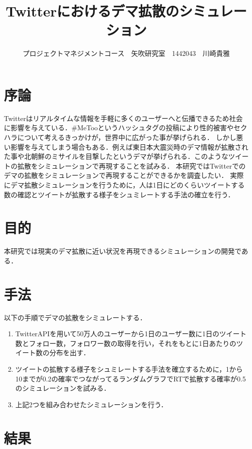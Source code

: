 \documentclass[uplatex,twocolumn,dvipdfmx]{jsarticle}
\title{\vspace{-5mm}\fontsize{14pt}{0pt}\selectfont Twitterにおけるデマ拡散のシミュレーション}
\author{\normalsize プロジェクトマネジメントコース　矢吹研究室　1442043　川崎貴雅}
\date{}
\begin{document}
\fontsize{10.5pt}{\baselineskip}\selectfont
\maketitle



\section{序論}\label{序論}

Twitterはリアルタイムな情報を手軽に多くのユーザーへと伝播できるため社会に影響を与えている．\#MeTooというハッシュタグの投稿により性的被害やセクハラについて考えるきっかけが，世界中に広がった事が挙げられる．
しかし悪い影響を与えてしまう場合もある．例えば東日本大震災時のデマ情報が拡散された事や北朝鮮のミサイルを目撃したというデマが挙げられる．このようなツイートの拡散をシミュレーションで再現することを試みる．
本研究ではTwitterでのデマの拡散をシミュレーションで再現することができるかを調査したい．
実際にデマ拡散シミュレーションを行うために，人は1日にどのくらいツイートする数の確認とツイートが拡散する様子をシュミレートする手法の確立を行う．

\section{目的}

本研究では現実のデマ拡散に近い状況を再現できるシミュレーションの開発である．

\section{手法}

以下の手順でデマの拡散をシミュレートする．
\begin{enumerate}
\item TwitterAPIを用いて50万人のユーザーから1日のユーザー数に1日のツイート数とフォロー数，フォロワー数の取得を行い，それをもとに1日あたりのツイート数の分布を出す．
\item ツイートの拡散する様子をシュミレートする手法を確立するために，1から10までが0.2の確率でつながってるランダムグラフでRTで拡散する確率が0.5のシミュレーションを試みる\cite{netto}．
\item 上記2つを組み合わせたシミュレーションを行う．
\end{enumerate}

\section{結果}
\end{document}
